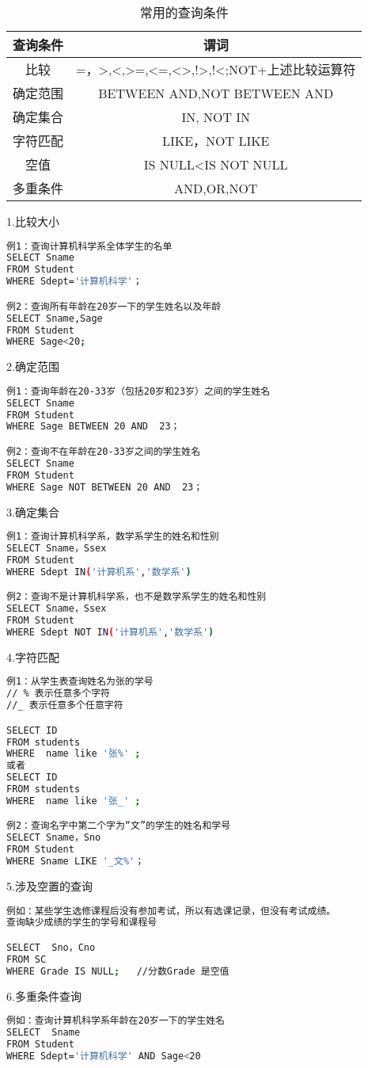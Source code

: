 \begin{table}[ht]
\centering
\caption{常用的查询条件}\label{tab_SQLgrm1}
\begin{tabular}{|c|c|}
\hline
查询条件& 谓词 \\
\hline
比较 & =，>,<,>=,<=,<>,!>,!<;NOT+上述比较运算符 \\
\hline
确定范围& BETWEEN AND,NOT BETWEEN AND \\
\hline
确定集合 & IN, NOT IN \\
\hline
字符匹配 & LIKE，NOT LIKE\\
\hline
空值& IS NULL<IS NOT NULL \\
\hline
多重条件 & AND,OR,NOT \\
\hline
\end{tabular}
\end{table}
1.比较大小
\begin{lstlisting}[language=bash]
例1：查询计算机科学系全体学生的名单
SELECT Sname
FROM Student
WHERE Sdept='计算机科学'；

例2：查询所有年龄在20岁一下的学生姓名以及年龄
SELECT Sname,Sage
FROM Student
WHERE Sage<20;
\end{lstlisting}
2.确定范围
\begin{lstlisting}[language=bash]
例1：查询年龄在20-33岁（包括20岁和23岁）之间的学生姓名
SELECT Sname
FROM Student
WHERE Sage BETWEEN 20 AND  23；

例2：查询不在年龄在20-33岁之间的学生姓名
SELECT Sname
FROM Student
WHERE Sage NOT BETWEEN 20 AND  23；
\end{lstlisting}
3.确定集合
\begin{lstlisting}[language=bash]
例1：查询计算机科学系，数学系学生的姓名和性别
SELECT Sname，Ssex
FROM Student
WHERE Sdept IN('计算机系','数学系')

例2：查询不是计算机科学系，也不是数学系学生的姓名和性别
SELECT Sname，Ssex
FROM Student
WHERE Sdept NOT IN('计算机系','数学系')
\end{lstlisting}
4.字符匹配
\begin{lstlisting}[language=bash]
例1：从学生表查询姓名为张的学号
// % 表示任意多个字符
//_ 表示任意多个任意字符

SELECT ID
FROM students
WHERE  name like '张%' ;
或者
SELECT ID
FROM students
WHERE  name like '张_' ;

例2：查询名字中第二个字为“文”的学生的姓名和学号
SELECT Sname，Sno
FROM Student
WHERE Sname LIKE '_文%'；
\end{lstlisting}

5.涉及空置的查询
\begin{lstlisting}[language=bash]
例如：某些学生选修课程后没有参加考试，所以有选课记录，但没有考试成绩。
查询缺少成绩的学生的学号和课程号

SELECT  Sno，Cno
FROM SC
WHERE Grade IS NULL;   //分数Grade 是空值
\end{lstlisting}
6.多重条件查询
\begin{lstlisting}[language=bash]
例如：查询计算机科学系年龄在20岁一下的学生姓名
SELECT  Sname
FROM Student
WHERE Sdept='计算机科学' AND Sage<20
\end{lstlisting}


